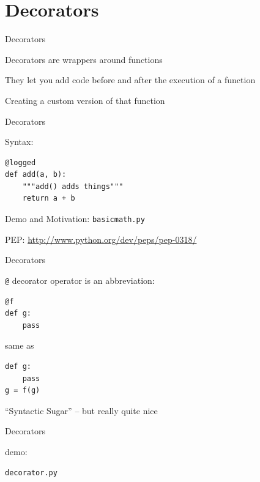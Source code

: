 \documentclass{beamer}
\begin{document}
\section{Decorators}

\begin{frame}[fragile]{Decorators}

{\LARGE Decorators are wrappers around functions}

\vfill
{\LARGE They let you add code before and after the execution of a function}

\vfill
{\LARGE Creating a custom version of that function}

\end{frame} 

\begin{frame}[fragile]{Decorators}

{\LARGE Syntax:}

\vfill
\begin{verbatim}
@logged
def add(a, b):
    """add() adds things"""
    return a + b
\end{verbatim}

\vfill
{\Large Demo and Motivation: \verb|basicmath.py| }

\vfill
PEP: \url{http://www.python.org/dev/peps/pep-0318/}

\end{frame} 

\begin{frame}[fragile]{Decorators}

{\LARGE \verb|@| decorator operator is an abbreviation:}

\vfill
\begin{verbatim}
@f
def g:
    pass
\end{verbatim}

\vfill
same as

\vfill
\begin{verbatim}
def g:
    pass
g = f(g)
\end{verbatim}

\vfill
{\Large ``Syntactic Sugar'' -- but really quite nice}

\end{frame} 

\begin{frame}[fragile]{Decorators}

{\LARGE demo:

\vfill
\begin{verbatim}
decorator.py
\end{verbatim}

}
\end{frame} 
\end{document}
